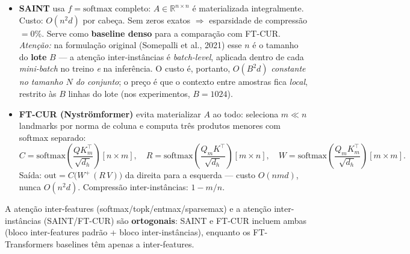 \documentclass[12pt,a4paper]{article}
\begin{document}
\begin{tcolorbox}[colback=fixbg, colframe=fixborder, fonttitle=\bfseries,
  title=\textbf{SAINT vs.\ FT-CUR: atenção inter-instâncias densa vs.\ comprimida}]
\begin{itemize}
  \item \textbf{SAINT} usa $f = \text{softmax}$ completo: $A \in \mathbb{R}^{n \times n}$
        é materializada integralmente. Custo: $O(n^2 d)$ por cabeça. Sem zeros exatos
        $\Rightarrow$ esparsidade de compressão $= 0\%$. Serve como \textbf{baseline
        denso} para a comparação com FT-CUR. \emph{Atenção:} na formulação original
        (Somepalli et al., 2021) esse $n$ é o tamanho do \textbf{lote} $B$ --- a
        atenção inter-instâncias é \textit{batch-level}, aplicada dentro de cada
        \textit{mini-batch} no treino \emph{e} na inferência. O custo é, portanto,
        $O(B^2 d)$ \emph{constante no tamanho $N$ do conjunto}; o preço é que o
        contexto entre amostras fica \emph{local}, restrito às $B$ linhas do lote
        (nos experimentos, $B = 1024$).
  \item \textbf{FT-CUR (Nyströmformer)} evita materializar $A$ ao todo:
        seleciona $m \ll n$ landmarks por norma de coluna e computa três produtos
        menores com softmax separado:
        \[
          C = \text{softmax}\!\!\left(\frac{Q K_m^\top}{\sqrt{d_h}}\right)\![n{\times}m],
          \quad
          R = \text{softmax}\!\!\left(\frac{Q_m K^\top}{\sqrt{d_h}}\right)\![m{\times}n],
          \quad
          W = \text{softmax}\!\!\left(\frac{Q_m K_m^\top}{\sqrt{d_h}}\right)\![m{\times}m].
        \]
        Saída: $\text{out} = C\bigl(W^+\,(R\,V)\bigr)$ da direita para a esquerda ---
        custo $O(nmd)$, nunca $O(n^2 d)$. Compressão inter-instâncias: $1 - m/n$.
\end{itemize}
\end{tcolorbox}

\noindent
A atenção inter-features (softmax/topk/entmax/sparsemax) e a atenção
inter-instâncias (SAINT/FT-CUR) são \textbf{ortogonais}: SAINT e FT-CUR
incluem ambas (bloco inter-features padrão + bloco inter-instâncias), enquanto
os FT-Transformers baselines têm apenas a inter-features.
\end{document}
